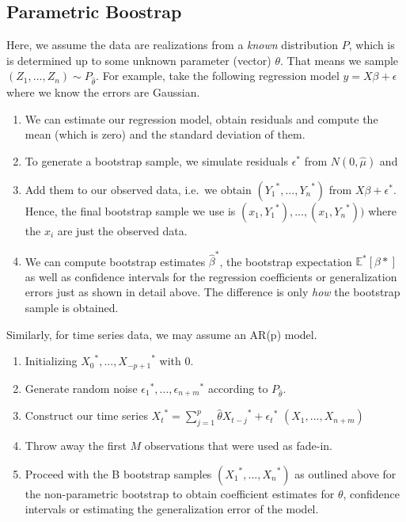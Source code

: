 \documentclass[]{book}
\providecommand{\tightlist}{%
  \setlength{\itemsep}{0pt}\setlength{\parskip}{0pt}}
\begin{document}
\subsection{Parametric Boostrap}\label{parametric-boostrap}

Here, we assume the data are realizations from a \emph{known}
distribution \(P\), which is is determined up to some unknown parameter
(vector) \(\theta\). That means we sample
\((Z_1, ..., Z_n) \sim P_{\hat{\theta}}\). For example, take the
following regression model \(y = X\beta + \epsilon\) where we know the
errors are Gaussian.

\begin{enumerate}
\def\labelenumi{\arabic{enumi}.}
\tightlist
\item
  We can estimate our regression model, obtain residuals and compute the
  mean (which is zero) and the standard deviation of them.
\item
  To generate a bootstrap sample, we simulate residuals \(\epsilon^*\)
  from \(N(0, \hat{\mu})\) and
\item
  Add them to our observed data, i.e.~we obtain
  \(({Y_1}^*, ..., {Y_n}^*)\) from \(X\beta + \epsilon^*\). Hence, the
  final bootstrap sample we use is
  \((x_1, {Y_1}^*), ..., (x_1, {Y_n}^*))\) where the \(x_i\) are just
  the observed data.
\item
  We can compute bootstrap estimates \(\hat{\beta}^*\), the bootstrap
  expectation \(\mathbb{E}^*[\beta*]\) as well as confidence intervals
  for the regression coefficients or generalization errors just as shown
  in detail above. The difference is only \emph{how} the bootstrap
  sample is obtained.
\end{enumerate}

Similarly, for time series data, we may assume an AR(p) model.

\begin{enumerate}
\def\labelenumi{\arabic{enumi}.}
\tightlist
\item
  Initializing \({X_0}^*, ..., {X_{-p+1}}^*\) with \(0\).
\item
  Generate random noise \({\epsilon_1}^*, ..., {\epsilon_{n+m}}^*\)
  according to \(P_{\hat{\theta}}\).
\item
  Construct our time series
  \({X_t}^* = \sum\limits_{j = 1}^p \hat{\theta}{X_{t-j}}^* + {\epsilon_t}^*\)
  \((X_1, ..., X_{n+m})\)
\item
  Throw away the first \(M\) observations that were used as fade-in.
\item
  Proceed with the B bootstrap samples \(({X_1}^*, ..., {X_n}^*)\) as
  outlined above for the non-parametric bootstrap to obtain coefficient
  estimates for \(\theta\), confidence intervals or estimating the
  generalization error of the model.
\end{enumerate}
\end{document}

